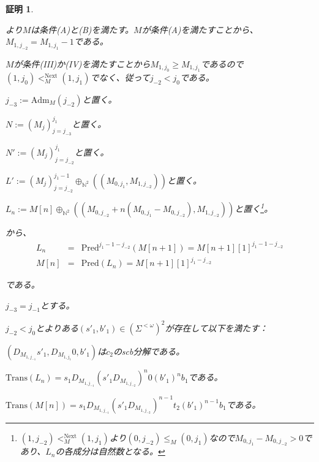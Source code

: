 \documentclass[dvipdfmx,uplatex]{jsarticle}
\theoremstyle{customnonumberbreakfortheorem}
\theoremstyle{customnonumberbreakforproof}
\newtheorem{hideableproof}{証明}
\begin{document}
\begin{hideableproof}
	\begin{indented}
		\item {}より\(M\)は条件(A)と(B)を満たす。\(M\)が条件(A)を満たすことから、\(M_{1,j_{-2}} = M_{1,j_1}-1\)である。
		\item \(M\)が条件(III)か(IV)を満たすことから\(M_{1,j_0} \geq M_{1,j_1}\)であるので\((1,j_0) <_M^{\textrm{Next}} (1,j_1)\)でなく、従って\(j_{-2} < j_0\)である。
		\item \(j_{-3} := \textrm{Adm}_M(j_{-2})\)と置く。
		\item \(N := (M_j)_{j=j_{-3}}^{j_1}\)と置く。
		\item \(N' := (M_j)_{j=j_{-2}}^{j_1}\)と置く。
		\item \(L' := (M_j)_{j=j_{-2}}^{j_1-1} \oplus_{\mathbb{N}^2} ((M_{0,j_1},M_{1,j_{-2}}))\)と置く。
		\item \(L_n := M[n] \oplus_{\mathbb{N}^2} ((M_{0,j_{-2}}+n(M_{0,j_1}-M_{0,j_{-2}}),M_{1,j_{-2}}))\)と置く\footnote{\((1,j_{-2}) <_M^{\textrm{Next}} (1,j_1)\)より\((0,j_{-2}) \leq_M (0,j_1)\)なので\(M_{0,j_1}-M_{0,j_{-2}} > 0\)であり、\(L_n\)の各成分は自然数となる。}。
		\item {}から、
		\begin{eqnarray*}
		L_n & = & \textrm{Pred}^{j_1-1-j_{-2}}(M[n+1]) = M[n+1][1]^{j_1-1-j_{-2}} \\
		M[n] & = & \textrm{Pred}(L_n) = M[n+1][1]^{j_1-j_{-2}}
		\end{eqnarray*}
		\item である。
		\item
		\item \(j_{-3} = j_{-1}\)とする。
		\begin{indented}
			\item \(j_{-2} < j_0\)とよりある\((s'_1,b'_1) \in (\Sigma^{< \omega})^2\)が存在して以下を満たす：
			\begin{penumerate}
				\item \((D_{M_{1,j_{-1}}} s'_1,D_{M_{1,j_1}} 0,b'_1)\)は\(c_2\)のscb分解である。
				\setcounter{penumeratei}{3}
				\item \(\textrm{Trans}(L_n) = s_1 D_{M_{1,j_{-1}}} (s'_1 D_{M_{1,j_{-2}}})^n 0 (b'_1)^n b_1\)である。
				\item \(\textrm{Trans}(M[n]) = s_1 D_{M_{1,j_{-1}}} (s'_1 D_{M_{1,j_{-2}}})^{n-1} t_2 (b'_1)^{n-1} b_1\)である。
			\end{penumerate}

\end{indented}
\end{indented}
\end{hideableproof}
\end{document}
